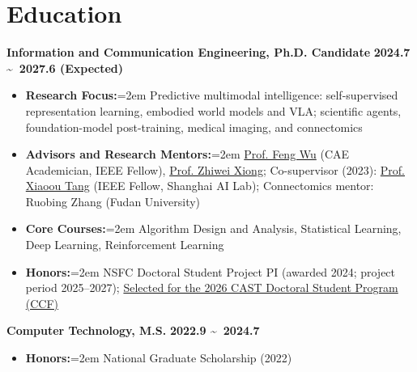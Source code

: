 \documentclass{resume}
\begin{document}
\section{\makebox[.75em][c]{\faGraduationCap} \textbf{Education}}
\begin{flushleft}
\textbf{Information and Communication Engineering, Ph.D. Candidate} \hfill \textbf{2024.7 \textasciitilde\ 2027.6 (Expected)}
\end{flushleft}
\begin{itemize}
    \item \textbf{Research Focus:}\hangindent=2em
    Predictive multimodal intelligence: self-supervised representation learning, embodied world models and VLA; scientific agents, foundation-model post-training, medical imaging, and connectomics
    \item \textbf{Advisors and Research Mentors:}\hangindent=2em
    \href{https://scholar.google.com/citations?user=5bInRDEAAAAJ&hl=en}{Prof. Feng Wu} (CAE Academician, IEEE Fellow), \href{https://scholar.google.com/citations?user=Snl0HPEAAAAJ&hl=en&oi=ao}{Prof. Zhiwei Xiong}; Co-supervisor (2023): \href{https://scholar.google.com/citations?user=qpBtpGsAAAAJ&hl=en}{Prof. Xiaoou Tang} (IEEE Fellow, Shanghai AI Lab); Connectomics mentor: Ruobing Zhang (Fudan University)
    \item \textbf{Core Courses:}\hangindent=2em
    Algorithm Design and Analysis, Statistical Learning, Deep Learning, Reinforcement Learning
    \item \textbf{Honors:}\hangindent=2em
    NSFC Doctoral Student Project PI (awarded 2024; project period 2025--2027); \href{https://ydchen0806.github.io/docs/cast_ccf_2026_selection_proof.png}{Selected for the 2026 CAST Doctoral Student Program (CCF)}
\end{itemize}

\begin{flushleft}
\textbf{Computer Technology, M.S.} \hfill \textbf{2022.9 \textasciitilde\ 2024.7}
\end{flushleft}
\begin{itemize}
    \item \textbf{Honors:}\hangindent=2em
    National Graduate Scholarship (2022)
\end{itemize}
\end{document}
